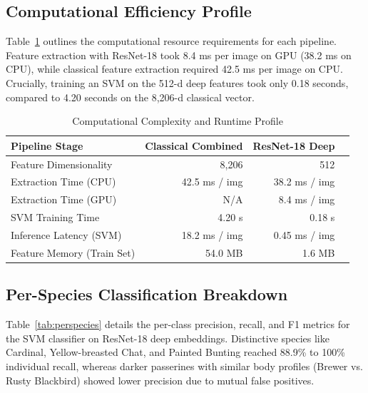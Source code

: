\documentclass[conference]{IEEEtran}
\begin{document}
\subsection{Computational Efficiency Profile}
Table~\ref{tab:compute} outlines the computational resource requirements for each pipeline. Feature extraction with ResNet-18 took 8.4 ms per image on GPU (38.2 ms on CPU), while classical feature extraction required 42.5 ms per image on CPU. Crucially, training an SVM on the 512-d deep features took only 0.18 seconds, compared to 4.20 seconds on the 8,206-d classical vector.

\begin{table}[H]
\caption{Computational Complexity and Runtime Profile}
\label{tab:compute}
\centering
\begin{tabular}{lrrr}
\toprule
\textbf{Pipeline Stage} & \textbf{Classical Combined} & \textbf{ResNet-18 Deep} \\
\midrule
Feature Dimensionality & 8,206 & 512 \\
Extraction Time (CPU) & 42.5 ms / img & 38.2 ms / img \\
Extraction Time (GPU) & N/A & 8.4 ms / img \\
SVM Training Time & 4.20 s & 0.18 s \\
Inference Latency (SVM) & 18.2 ms / img & 0.45 ms / img \\
Feature Memory (Train Set) & 54.0 MB & 1.6 MB \\
\bottomrule
\end{tabular}
\end{table}

\subsection{Per-Species Classification Breakdown}
Table~\ref{tab:perspecies} details the per-class precision, recall, and F1 metrics for the SVM classifier on ResNet-18 deep embeddings. Distinctive species like Cardinal, Yellow-breasted Chat, and Painted Bunting reached 88.9\% to 100\% individual recall, whereas darker passerines with similar body profiles (Brewer vs. Rusty Blackbird) showed lower precision due to mutual false positives.
\end{document}
